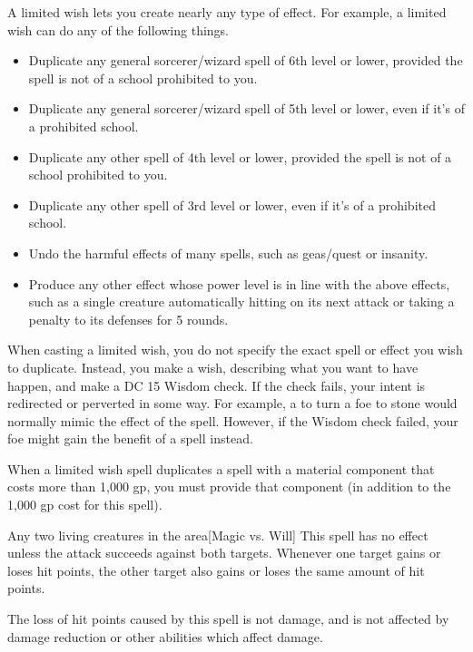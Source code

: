 \spelleffect A limited wish lets you create nearly any type of effect. For example, a limited wish can do any of the following things.
\begin{itemize}
    \item Duplicate any general sorcerer/wizard spell of 6th level or lower, provided the spell is not of a school prohibited to you.
    \item Duplicate any general sorcerer/wizard spell of 5th level or lower, even if it's of a prohibited school.
    \item Duplicate any other spell of 4th level or lower, provided the spell is not of a school prohibited to you.
    \item Duplicate any other spell of 3rd level or lower, even if it's of a prohibited school.
    \item Undo the harmful effects of many spells, such as geas/quest or insanity.
    \item Produce any other effect whose power level is in line with the above effects, such as a single creature automatically hitting on its next attack or taking a  penalty to its defenses for 5 rounds.
\end{itemize}
\par When casting a limited wish, you do not specify the exact spell or effect you wish to duplicate. Instead, you make a wish, describing what you want to have happen, and make a DC 15 Wisdom check. If the check fails, your intent is redirected or perverted in some way. For example, a  to turn a foe to stone would normally mimic the  effect of the  spell. However, if the Wisdom check failed, your foe might gain the benefit of a  spell instead.
\par When a limited wish spell duplicates a spell with a material component that costs more than 1,000 gp, you must provide that component (in addition to the 1,000 gp cost for this spell).

\spelldur{\durshort}
\begin{spelltargets}{Any two living creatures in the area}[Magic vs. Will]
    \spellspecial This spell has no effect unless the attack succeeds against both targets.
    \spellsuccess Whenever one target gains or loses hit points, the other target also gains or loses the same amount of hit points.
\end{spelltargets}
\spellnotes The loss of hit points caused by this spell is not damage, and is not affected by damage reduction or other abilities which affect damage.

